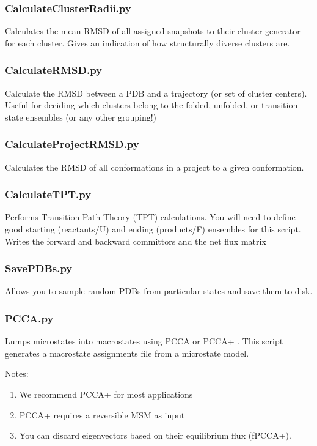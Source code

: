 \documentclass[12pt]{article}
\begin{document}
\subsubsection{CalculateClusterRadii.py}
Calculates the mean RMSD of all assigned snapshots to their cluster generator for each cluster. Gives an indication of how structurally diverse clusters are.

\subsubsection{CalculateRMSD.py}
Calculate the RMSD between a PDB and a trajectory (or set of cluster centers). Useful for deciding which clusters belong to the folded, unfolded, or transition state ensembles (or any other grouping!)

\subsubsection{CalculateProjectRMSD.py}
Calculates the RMSD of all conformations in a project to a given conformation.

\subsubsection{CalculateTPT.py}
Performs Transition Path Theory (TPT) calculations. You will need to define good starting (reactants/U) and ending (products/F) ensembles for this script. Writes the forward and backward committors and the net flux matrix

\subsubsection{SavePDBs.py}
Allows you to sample random PDBs from particular states and save them to disk.

\subsubsection{PCCA.py}
Lumps microstates into macrostates using PCCA \cite{Deuflhard2000} or PCCA+ \cite{Deuflhard2005, kube2007coarse}. This script generates a macrostate assignments file from a microstate model.  

Notes:
\begin{enumerate}
 \item We recommend PCCA+ for most applications
 \item PCCA+ requires a reversible MSM as input
 \item You can discard eigenvectors based on their equilibrium flux (fPCCA+).
\end{enumerate}
\end{document}
